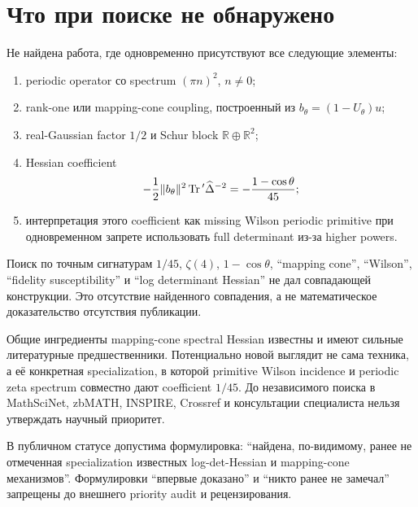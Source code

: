 \section{Что при поиске не обнаружено}

Не найдена работа, где одновременно присутствуют все следующие элементы:
\begin{enumerate}
 \item periodic operator со spectrum \((\pi n)^2\), \(n\ne0\);
 \item rank-one или mapping-cone coupling, построенный из
 \(b_\theta=(1-U_\theta)u\);
 \item real-Gaussian factor \(1/2\) и Schur block
 \(\mathbb R\oplus\mathbb R^2\);
 \item Hessian coefficient
 \begin{equation}
  -\frac12\|b_\theta\|^2
  \operatorname{Tr}{}'\widehat\Delta^{-2}
  =-\frac{1-\cos\theta}{45};
 \end{equation}
 \item интерпретация этого coefficient как missing Wilson periodic
 primitive при одновременном запрете использовать full determinant из-за
 higher powers.
\end{enumerate}

Поиск по точным сигнатурам \(1/45\), \(\zeta(4)\),
\(1-\cos\theta\), ``mapping cone'', ``Wilson'', ``fidelity
susceptibility'' и ``log determinant Hessian'' не дал совпадающей
конструкции. Это отсутствие найденного совпадения, а не математическое
доказательство отсутствия публикации.

\begin{proposition}
Общие ингредиенты mapping-cone spectral Hessian известны и имеют сильные
литературные предшественники. Потенциально новой выглядит не сама техника, а
её конкретная specialization, в которой primitive Wilson incidence и
periodic zeta spectrum совместно дают coefficient \(1/45\). До независимого
поиска в MathSciNet, zbMATH, INSPIRE, Crossref и консультации специалиста
нельзя утверждать научный приоритет.
\end{proposition}

\begin{protocol}
В публичном статусе допустима формулировка:
``найдена, по-видимому, ранее не отмеченная specialization известных
log-det-Hessian и mapping-cone механизмов''. Формулировки ``впервые
доказано'' и ``никто ранее не замечал'' запрещены до внешнего priority audit
и рецензирования.
\end{protocol}
